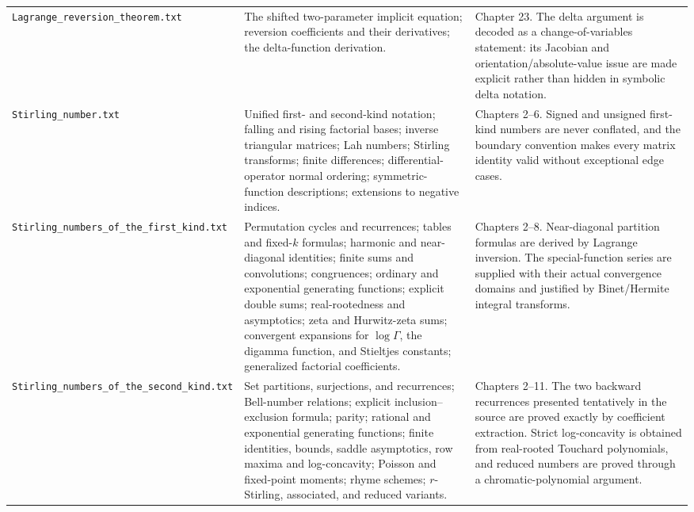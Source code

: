 \documentclass[11pt,a4paper,oneside,openany]{book}
\theoremstyle{definition}
\theoremstyle{remark}
\begin{document}
\begin{longtable}{>{\raggedright\arraybackslash}p{}
                  >{\raggedright\arraybackslash}p{}
                  >{\raggedright\arraybackslash}p{}}
\nolinkurl{Lagrange_reversion_theorem.txt}
& The shifted two-parameter implicit equation; reversion coefficients and their
  derivatives; the delta-function derivation.
& Chapter 23.  The delta argument is decoded as a change-of-variables statement:
  its Jacobian and orientation/absolute-value issue are made explicit rather than
  hidden in symbolic delta notation.\\[1ex]

\nolinkurl{Stirling_number.txt}
& Unified first- and second-kind notation; falling and rising factorial bases;
  inverse triangular matrices; Lah numbers; Stirling transforms; finite
  differences; differential-operator normal ordering; symmetric-function
  descriptions; extensions to negative indices.
& Chapters 2--6.  Signed and unsigned first-kind numbers are never conflated, and
  the boundary convention makes every matrix identity valid without exceptional
  edge cases.\\[1ex]

\nolinkurl{Stirling_numbers_of_the_first_kind.txt}
& Permutation cycles and recurrences; tables and fixed-$k$ formulas; harmonic and
  near-diagonal identities; finite sums and convolutions; congruences; ordinary
  and exponential generating functions; explicit double sums; real-rootedness
  and asymptotics; zeta and Hurwitz-zeta sums; convergent expansions for
  $\log\Gamma$, the digamma function, and Stieltjes constants; generalized
  factorial coefficients.
& Chapters 2--8.  Near-diagonal partition formulas are derived by Lagrange
  inversion.  The special-function series are supplied with their actual
  convergence domains and justified by Binet/Hermite integral transforms.\\[1ex]

\nolinkurl{Stirling_numbers_of_the_second_kind.txt}
& Set partitions, surjections, and recurrences; Bell-number relations; explicit
  inclusion--exclusion formula; parity; rational and exponential generating
  functions; finite identities, bounds, saddle asymptotics, row maxima and
  log-concavity; Poisson and fixed-point moments; rhyme schemes; $r$-Stirling,
  associated, and reduced variants.
& Chapters 2--11.  The two backward recurrences presented tentatively in the
  source are proved exactly by coefficient extraction.  Strict log-concavity is
  obtained from real-rooted Touchard polynomials, and reduced numbers are proved
  through a chromatic-polynomial argument.\\
\end{longtable}
\renewcommand{\arraystretch}{1}
\end{document}
